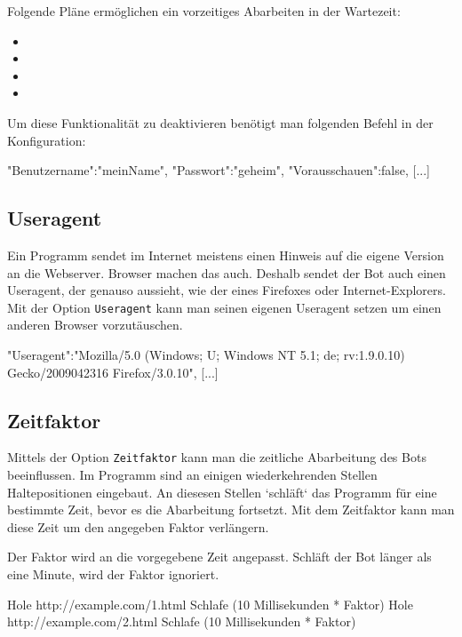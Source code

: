 \documentclass{scrartcl}
\begin{document}
Folgende Pläne ermöglichen ein vorzeitiges Abarbeiten in der Wartezeit:
\begin{itemize}
  \item {}
  \item {}
  \item {}
  \item {}
\end{itemize}

Um diese Funktionalität zu deaktivieren benötigt man folgenden Befehl in der Konfiguration:

\begin{code}[language=bash]
"Benutzername":"meinName",
"Passwort":"geheim",
"Vorausschauen":false,
[...]
\end{code}


\subsection{Useragent}
\label{Useragent}

Ein Programm sendet im Internet meistens einen Hinweis auf die eigene Version an die Webserver. Browser machen das auch. Deshalb sendet der Bot auch einen Useragent, der genauso aussieht, wie der eines Firefoxes oder Internet-Explorers. Mit der Option \texttt{Useragent} kann man seinen eigenen Useragent setzen um einen anderen Browser vorzutäuschen.

\begin{code}[language=bash,basicstyle=\tiny\ttfamily]
[...]
"Useragent":"Mozilla/5.0 (Windows; U; Windows NT 5.1; de; rv:1.9.0.10) Gecko/2009042316 Firefox/3.0.10",
[...]
\end{code}

\subsection{Zeitfaktor}
\label{Zeitfaktor}

Mittels der Option \texttt{Zeitfaktor} kann man die zeitliche Abarbeitung des Bots beeinflussen. Im Programm sind an einigen wiederkehrenden Stellen Haltepositionen eingebaut. An diesesen Stellen `schläft` das Programm für eine bestimmte Zeit, bevor es die Abarbeitung fortsetzt. Mit dem Zeitfaktor kann man diese Zeit um den angegeben Faktor verlängern.

Der Faktor wird an die vorgegebene Zeit angepasst. Schläft der Bot länger als eine Minute, wird der Faktor ignoriert. 

\begin{code}
Hole http://example.com/1.html
Schlafe (10 Millisekunden * Faktor)
Hole http://example.com/2.html
Schlafe (10 Millisekunden * Faktor)
\end{code}
\end{document}
